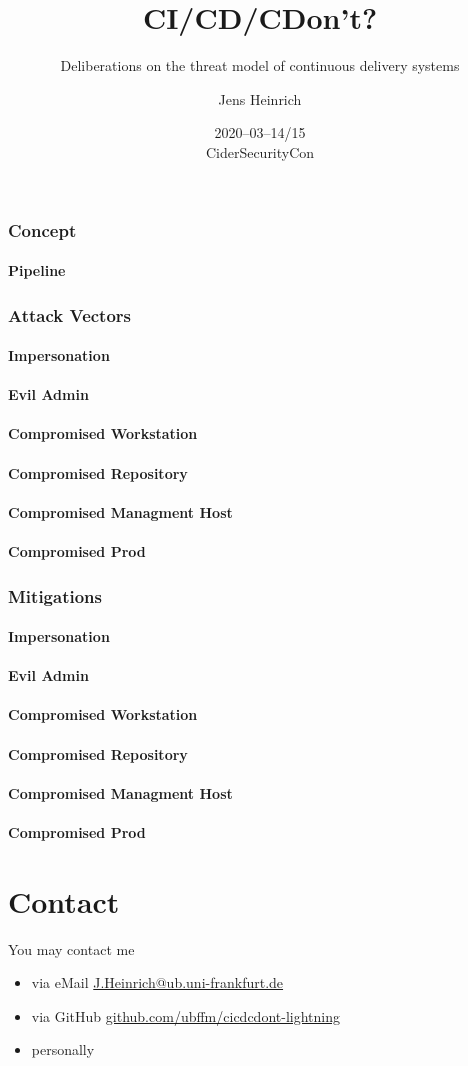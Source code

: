 \documentclass{beamer}
\title{CI/CD/CDon't?}
\subtitle{Deliberations on the threat model of continuous delivery systems}
\date[CiderSecurityCon]{2020--03--14/15\\CiderSecurityCon}
\institute[UBFFM]{\href{https://www.ub.uni-frankfurt.de}{Universit\"atsbibliothek Johann Christian Senckenberg}}
\author[J
	{\includegraphics[
		keepaspectratio,
		height=4pt
		]
		{icon.png}
		}
		]{Jens Heinrich}
\begin{document}
\begin{frame}
	\titlepage
\end{frame}

\begin{frame}
	\frametitle<1-1>{Concept}
	\framesubtitle<1-1>{Pipeline}
	\frametitle<2-7>{Attack Vectors}
	\framesubtitle<2-2>{Impersonation}
	\framesubtitle<3-3>{Evil Admin}
	\framesubtitle<4-4>{Compromised Workstation}
	\framesubtitle<5-5>{Compromised Repository}
	\framesubtitle<6-6>{Compromised Managment Host}
	\framesubtitle<7-7>{Compromised Prod}
	\frametitle<8-13>{Mitigations}
	\framesubtitle<8-8>{Impersonation}
	\framesubtitle<9-9>{Evil Admin}
	\framesubtitle<10-10>{Compromised Workstation}
	\framesubtitle<11-11>{Compromised Repository}
	\framesubtitle<12-12>{Compromised Managment Host}
	\framesubtitle<13-13>{Compromised Prod}
	
\end{frame}

\section{Contact}
\begin{frame}
	You may contact me
	\begin{itemize}
		\item via eMail \href{mailto://J.Heinrich@ub.uni-frankfurt.de}{\url{J.Heinrich@ub.uni-frankfurt.de}} \\
		\item via GitHub \href{https://github.com/ubffm/cicdcdont-lightning}{\url{github.com/ubffm/cicdcdont-lightning}} \\
		\item personally
	\end{itemize}
\end{frame}
\end{document}
